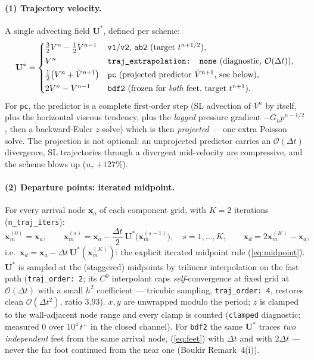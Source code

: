 \documentclass[11pt,a4paper]{article}
\newcommand{\ut}{u_\tau}
\newcommand{\bU}{\mathbf{U}}
\newcommand{\bx}{\mathbf{x}}
\begin{document}
\paragraph{(1) Trajectory velocity.} A single advecting field
$\bU^{*}$, defined per scheme:
\begin{equation}
\bU^{*} =
\begin{cases}
\tfrac32 V^{n}-\tfrac12 V^{n-1} & \text{\texttt{v1}/\texttt{v2}, \texttt{ab2}
(target $t^{n+1/2}$)},\\[2pt]
V^{n} & \text{\texttt{traj\_extrapolation: none} (diagnostic, $\mathcal O(\Delta t)$)},\\[2pt]
\tfrac12\big(V^{n}+\tilde V^{n+1}\big) & \text{\texttt{pc} (projected predictor
$\tilde V^{n+1}$, see below)},\\[2pt]
2V^{n}-V^{n-1} & \text{\texttt{bdf2} (frozen for \emph{both} feet, target $t^{n+1}$)}.
\end{cases}
\label{eq:ustar}
\end{equation}
For \texttt{pc}, the predictor is a complete first-order step (SL advection of
$V^{n}$ by itself, plus the horizontal viscous tendency, plus the
\emph{lagged} pressure gradient $-G_h p^{n-1/2}$, then a backward-Euler
$z$-solve) which is then \emph{projected} --- one extra Poisson solve. The
projection is not optional: an unprojected predictor carries an
$\mathcal O(\Delta t)$ divergence, SL trajectories through a divergent
mid-velocity are compressive, and the scheme blows up
($\ut$ $+127\%$).

\paragraph{(2) Departure points: iterated midpoint.} For every arrival node
$\bx_a$ of each component grid, with $K=2$ iterations
(\texttt{n\_traj\_iters}):
\begin{equation}
\bx_m^{(0)}=\bx_a,\qquad
\bx_m^{(s)} = \bx_a - \frac{\Delta t}{2}\,\bU^{*}\!\big(\bx_m^{(s-1)}\big),
\quad s=1,\dots,K,\qquad
\bx_d = 2\bx_m^{(K)}-\bx_a,
\label{eq:feet}
\end{equation}
i.e.\ $\bx_d = \bx_a - \Delta t\,\bU^{*}(\bx_m^{(K)})$: the explicit iterated
midpoint rule (\ref{eq:midpoint}). $\bU^{*}$ is sampled at the (staggered)
midpoints by trilinear interpolation on the fast path
(\texttt{traj\_order:~2}; its $C^{0}$ interpolant caps \emph{self}-convergence
at fixed grid at $\mathcal O(\Delta t)$ with a small $h^{2}$ coefficient ---
tricubic sampling, \texttt{traj\_order:~4}, restores clean
$\mathcal O(\Delta t^{2})$, ratio $3.93$). $x,y$ are unwrapped modulo the
period; $z$ is clamped to the wall-adjacent node range and every clamp is
counted (\texttt{clamped} diagnostic; measured $0$ over $10^{4}\,t^{+}$ in
the closed channel). For \texttt{bdf2} the same $\bU^{*}$ traces \emph{two
independent} feet from the same arrival node, (\ref{eq:feet}) with
$\Delta t$ and with $2\Delta t$ --- never the far foot continued from the
near one (Boukir Remark~4(i)).
\end{document}
